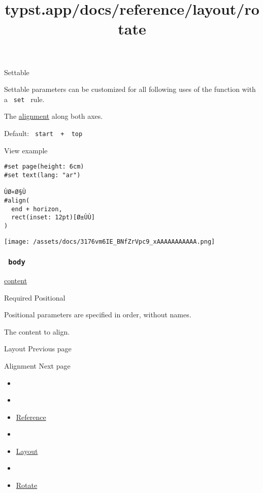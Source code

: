 {{ Settable }}

\label{parameters-alignment-settable-tooltip}
Settable parameters can be customized for all following uses of the
function with a \texttt{\ set\ } rule.

The \href{/docs/reference/layout/alignment/}{alignment} along both axes.

Default: \texttt{\ start\ }{\texttt{\ +\ }}\texttt{\ top\ }


View example

\begin{verbatim}
#set page(height: 6cm)
#set text(lang: "ar")

ÙØ«Ø§Ù
#align(
  end + horizon,
  rect(inset: 12pt)[Ø±ÙÙ]
)
\end{verbatim}

\texttt{[image: /assets/docs/3176vm6IE\_BNfZrVpc9\_xAAAAAAAAAAA.png]}

\subsubsection{\texorpdfstring{\texttt{\ body\ }}{ body }}\label{parameters-body}

\href{/docs/reference/foundations/content/}{content}

{Required} {{ Positional }}

\label{parameters-body-positional-tooltip}
Positional parameters are specified in order, without names.

The content to align.

\href{/docs/reference/layout/}{\pandocbounded{}}

{ Layout } { Previous page }

\href{/docs/reference/layout/alignment/}{\pandocbounded{}}

{ Alignment } { Next page }


\title{typst.app/docs/reference/layout/rotate}

\begin{itemize}
\tightlist
\item
  \href{/docs}{}
\item
  
\item
  \href{/docs/reference/}{Reference}
\item
  
\item
  \href{/docs/reference/layout/}{Layout}
\item
  
\item
  \href{/docs/reference/layout/rotate/}{Rotate}
\end{itemize}

